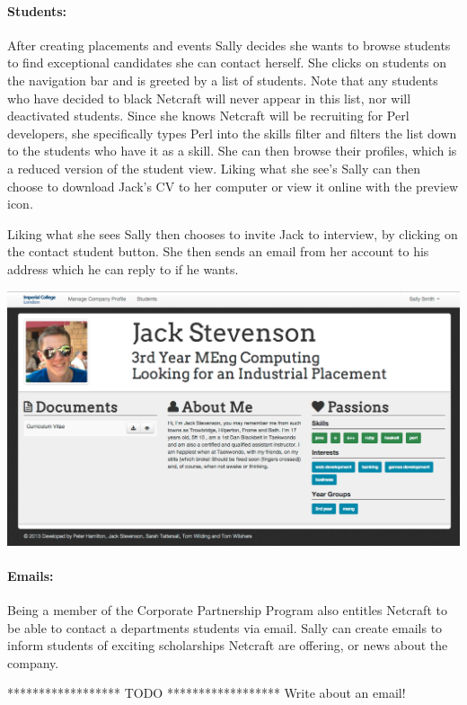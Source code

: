   \paragraph{Students:}
    After creating placements and events Sally decides she wants to browse students to find exceptional candidates she can contact herself. She clicks on students on the navigation bar and is greeted by a list of students. Note that any students who have decided to black Netcraft will never appear in this list, nor will deactivated students.
    Since she knows Netcraft will be recruiting for Perl developers, she specifically types Perl into the skills filter
    and filters the list down to the students who have it as a skill.
    She can then browse their profiles, which is a reduced version of the student view. Liking what she see's Sally can then choose to download Jack's CV to her computer or view it online with the preview icon. 

    Liking what she sees Sally then chooses to invite Jack to interview, by clicking on the contact student button. She then sends an email from her account to his address which he can reply to if he wants. 

    \begin{center}
    \includegraphics[scale=0.3]{images/user_experiences/company/jack_profile}
    \end{center}

  \paragraph{Emails:}
    Being a member of the Corporate Partnership Program also entitles Netcraft to be able to contact a departments students via email. Sally can create emails to inform students of exciting scholarships Netcraft are offering, or news about the company.

    ****************** TODO ******************
    Write about an email!

